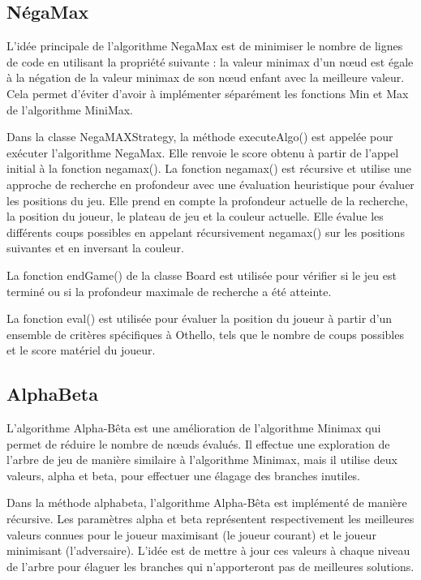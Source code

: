 \documentclass[12pt]{article}
\begin{document}
	
	\subsection{NégaMax}
	L'idée principale de l'algorithme NegaMax est de minimiser le nombre de lignes de code en utilisant la propriété suivante : la valeur minimax d'un nœud est égale à la négation de la valeur minimax de son nœud enfant avec la meilleure valeur. Cela permet d'éviter d'avoir à implémenter séparément les fonctions Min et Max de l'algorithme MiniMax.
	
	Dans la classe NegaMAXStrategy, la méthode executeAlgo() est appelée pour exécuter l'algorithme NegaMax. Elle renvoie le score obtenu à partir de l'appel initial à la fonction negamax().
	La fonction negamax() est récursive et utilise une approche de recherche en profondeur avec une évaluation heuristique pour évaluer les positions du jeu. Elle prend en compte la profondeur actuelle de la recherche, la position du joueur, le plateau de jeu et la couleur actuelle. Elle évalue les différents coups possibles en appelant récursivement negamax() sur les positions suivantes et en inversant la couleur.

	La fonction endGame() de la classe Board est utilisée pour vérifier si le jeu est terminé ou si la profondeur maximale de recherche a été atteinte.
	
	La fonction eval() est utilisée pour évaluer la position du joueur à partir d'un ensemble de critères spécifiques à Othello, tels que le nombre de coups possibles et le score matériel du joueur.
	
	\subsection{AlphaBeta}
	L'algorithme Alpha-Bêta est une amélioration de l'algorithme Minimax qui permet de réduire le nombre de nœuds évalués. Il effectue une exploration de l'arbre de jeu de manière similaire à l'algorithme Minimax, mais il utilise deux valeurs, alpha et beta, pour effectuer une élagage des branches inutiles.
	
	Dans la méthode alphabeta, l'algorithme Alpha-Bêta est implémenté de manière récursive. Les paramètres alpha et beta représentent respectivement les meilleures valeurs connues pour le joueur maximisant (le joueur courant) et le joueur minimisant (l'adversaire). L'idée est de mettre à jour ces valeurs à chaque niveau de l'arbre pour élaguer les branches qui n'apporteront pas de meilleures solutions.
	
\end{document}
